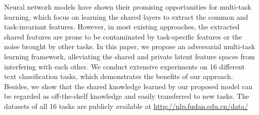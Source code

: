 Neural network models have shown their promising opportunities for multi-task learning, which focus on learning the shared layers to extract the common and task-invariant features. However, in most existing approaches, the extracted shared features are prone to be contaminated by task-specific features or the noise brought by other tasks. In this paper, we propose an adversarial multi-task learning framework, alleviating the shared and private latent feature spaces from interfering with each other. We conduct extensive experiments on 16 different text classification tasks, which demonstrates the benefits of our approach. Besides, we show that the shared knowledge learned by our proposed model can be regarded as off-the-shelf knowledge and easily transferred to new tasks. The datasets of all 16 tasks are publicly available at \url{http://nlp.fudan.edu.cn/data/}
